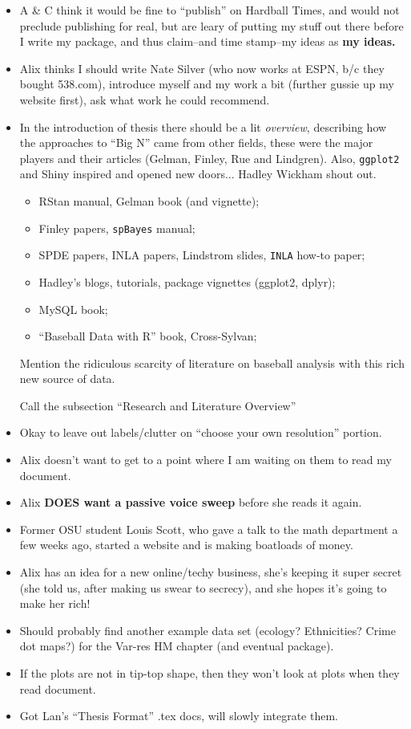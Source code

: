 \documentclass{article}
\begin{document}
\begin{itemize}
\item A \& C think it would be fine to ``publish'' on Hardball Times, and would not preclude publishing for real, but are leary of putting my stuff out there before I write my package, and thus claim--and time stamp--my ideas as {\bf my ideas.}
\item Alix thinks I should write Nate Silver (who now works at ESPN, b/c they bought 538.com), introduce myself and my work a bit (further gussie up my website first), ask what work he could recommend.
\item In the introduction of thesis there should be a lit {\it overview}, describing how the approaches to ``Big N'' came from other fields, these were the major players and their articles (Gelman, Finley, Rue and Lindgren). Also, \verb|ggplot2| and Shiny inspired and opened new doors... Hadley Wickham shout out.
  \begin{itemize}
  \item RStan manual, Gelman book (and vignette); 
  \item Finley papers, \verb|spBayes| manual; 
  \item SPDE papers, INLA papers, Lindstrom slides, \verb|INLA| how-to paper; 
  \item Hadley's blogs, tutorials, package vignettes (ggplot2, dplyr); 
  \item MySQL book; 
  \item ``Baseball Data with R'' book, Cross-Sylvan;
  \end{itemize}
Mention the ridiculous scarcity of literature on baseball analysis with this rich new source of data.

Call the subsection ``Research and Literature Overview''
\item Okay to leave out labels/clutter on ``choose your own resolution'' portion.
\item Alix doesn't want to get to a point where I am waiting on them to read my document.
\item Alix {\bf DOES want a passive voice sweep} before she reads it again.
\item Former OSU student Louis Scott, who gave a talk to the math department a few weeks ago, started a website and is making boatloads of money.
\item Alix has an idea for a new online/techy business, she's keeping it super secret (she told us, after making us swear to secrecy), and she hopes it's going to make her rich!
\item Should probably find another example data set (ecology? Ethnicities? Crime dot maps?) for the Var-res HM chapter (and eventual package).
\item If the plots are not in tip-top shape, then they won't look at plots when they read document.
\item Got Lan's ``Thesis Format'' .tex docs, will slowly integrate them.
\end{itemize}
\end{document}

